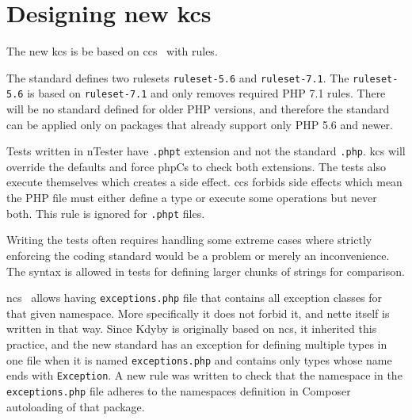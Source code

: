 \section{Designing new \acrlong{kcs}}

The new \gls{kcs} is be based on \gls{ccs}~\cite{consistence:coding-standard} with  rules.

The standard defines two rulesets \lstinline{ruleset-5.6} and \lstinline{ruleset-7.1}. The \lstinline{ruleset-5.6} is based on \lstinline{ruleset-7.1} and only removes required PHP 7.1 rules. There will be no standard defined for older PHP versions, and therefore the standard can be applied only on packages that already support only PHP 5.6 and newer.


Tests written in \gls{nTester} have \lstinline{.phpt} extension and not the standard \lstinline{.php}. \gls{kcs} will override the defaults and force \gls{phpCs} to check both extensions. The tests also execute themselves which creates a side effect. \gls{ccs} forbids side effects which mean the PHP file must either define a type or execute some operations but never both. This rule is ignored for \lstinline{.phpt} files.

Writing the tests often requires handling some extreme cases where strictly enforcing the coding standard would be a problem or merely an inconvenience. The  syntax is allowed in tests for defining larger chunks of strings for comparison.


\gls{ncs}~\cite{nette:coding-standard} allows having \lstinline{exceptions.php} file that contains all exception classes for that given namespace. More specifically it does not forbid it, and \gls{nette} itself is written in that way. Since Kdyby is originally based on \gls{ncs}, it inherited this practice, and the new standard has an exception for defining multiple types in one file when it is named \lstinline{exceptions.php} and contains only types whose name ends with \lstinline{Exception}. A new rule was written to check that the namespace in the \lstinline{exceptions.php} file adheres to the namespaces definition in Composer autoloading of that package.


